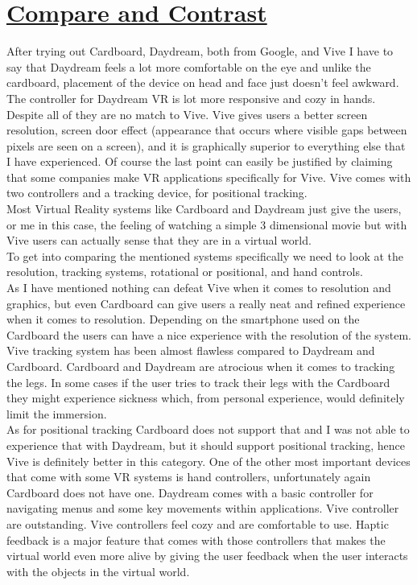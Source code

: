\documentclass{article}
\begin{document}
\newpage

\section*{\underline{Compare and Contrast}}

After trying out Cardboard, Daydream, both from Google, and Vive I have to say that Daydream feels a lot more comfortable on the eye and unlike the cardboard, placement of the device on head and face just doesn't feel awkward. The controller for Daydream VR is lot more responsive and cozy in hands. Despite all of they are no match to Vive. Vive gives users a better screen resolution, screen door effect (appearance that occurs where visible gaps between pixels are seen on a screen),  and it is graphically superior to everything else that I have experienced. Of course the last point can easily be justified by claiming that some companies make VR applications specifically for Vive. Vive comes with two controllers and a tracking device, for positional tracking.\\ 
Most Virtual Reality systems like Cardboard and Daydream just give the users, or me in this case, the feeling of watching a simple 3 dimensional movie but with Vive users can actually sense that they are in a virtual world. \\

To get into comparing the mentioned systems specifically we need to look at the resolution, tracking systems, rotational or positional, and hand controls. \\ As I have mentioned nothing can defeat Vive when it comes to resolution and graphics, but even Cardboard can give users a really neat and refined experience when it comes to resolution. Depending on the smartphone used on the Cardboard the users can have a nice experience with the resolution of the system. Vive tracking system has been almost flawless compared to Daydream and Cardboard. Cardboard and Daydream are atrocious when it comes to tracking the legs. In some cases if the user tries to track their legs with the Cardboard they might experience sickness which, from personal experience, would definitely limit the immersion.\\
As for positional tracking Cardboard does not support that and I was not able to experience that with Daydream, but it should support positional tracking, hence Vive is definitely better in this category.
One of the other most important devices that come with some VR systems is hand controllers, unfortunately again Cardboard does not have one. Daydream comes with a basic controller for navigating menus and some key movements within applications. Vive controller are outstanding. Vive controllers feel cozy and are comfortable to use. Haptic feedback is a major feature that comes with those controllers that makes the virtual world even more alive by giving the user feedback when the user interacts with the objects in the virtual world.
\end{document}
